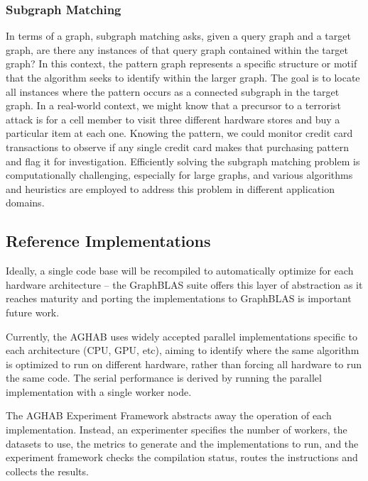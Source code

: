     \subsubsection{Subgraph Matching}
        In terms of a graph, subgraph matching asks, given a query graph and a target graph, are there any instances of that query graph contained within the target graph? 
        In this context, the pattern graph represents a specific structure or motif that the algorithm seeks to identify within the larger graph. 
        The goal is to locate all instances where the pattern occurs as a connected subgraph in the target graph. 
        In a real-world context, we might know that a precursor to a terrorist attack is for a cell member to visit three different hardware stores and buy a particular item at each one. 
        Knowing the pattern, we could monitor credit card transactions to observe if any single credit card makes that purchasing pattern and flag it for investigation. 
        Efficiently solving the subgraph matching problem is computationally challenging, especially for large graphs, and various algorithms and heuristics are employed to address this problem in different application domains. 

\subsection{Reference Implementations}\label{subsection:reference_implementations}

Ideally, a single code base will be recompiled to automatically optimize for each hardware architecture -- the GraphBLAS suite offers this layer of abstraction as it reaches maturity and porting the implementations to GraphBLAS is important future work. 

Currently, the AGHAB uses widely accepted parallel implementations specific to each architecture (CPU, GPU, etc), aiming to identify where the same algorithm is optimized to run on different hardware, rather than forcing all hardware to run the same code.
The serial performance is derived by running the parallel implementation with a single worker node.

The AGHAB Experiment Framework abstracts away the operation of each implementation. 
Instead, an experimenter specifies the number of workers, the datasets to use, the metrics to generate and the implementations to run, and the experiment framework checks the compilation status, routes the instructions and collects the results.

